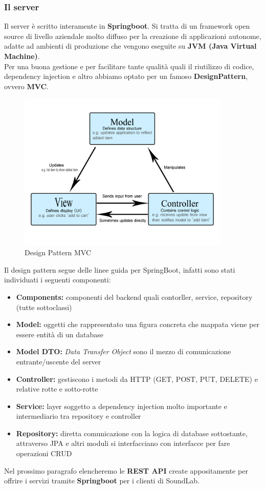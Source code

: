 \documentclass{article}
\begin{document}
		\subsubsection{Il server}
		Il server è scritto interamente in \textbf{Springboot}.
		Si tratta di un framework open source di livello aziendale molto diffuso per la creazione di applicazioni autonome, adatte ad ambienti di produzione che vengono eseguite su \textbf{JVM (Java Virtual Machine)}.\\
		Per una buona gestione e per facilitare tante qualità quali il riutilizzo di codice, dependency injection e altro abbiamo optato per un famoso \textbf{DesignPattern}, ovvero \textbf{MVC}.
		\begin{figure}[H]
			\centering
			\includegraphics[width=0.9\textwidth]{Immagini/mvc}
			\caption{Design Pattern MVC}
		\end{figure}
		Il design pattern segue delle linee guida per SpringBoot, infatti sono stati individuati i seguenti componenti:
		\begin{itemize}
			\item \textbf{Components:} componenti del backend quali contorller, service, repository (tutte sottoclassi)
			\item \textbf{Model:} oggetti che rappresentato una figura concreta che mappata viene per essere entità di un database
			\item \textbf{Model DTO:} \textit{Data Transfer Object} sono il mezzo di comunicazione entrante/uscente del server
			\item \textbf{Controller:} gestiscono i metodi da HTTP (GET, POST, PUT, DELETE) e relative rotte e sotto-rotte
			\item \textbf{Service:} layer soggetto a dependency injection molto importante e intermediario tra repository e controller
			\item \textbf{Repository:} diretta comunicazione con la logica di database sottostante, attraverso JPA e altri moduli si interfacciano con interfacce per fare
			operazioni CRUD
		\end{itemize}
	Nel prossimo paragrafo elencheremo le \textbf{REST API} create appositamente per offrire i servizi tramite \textbf{Springboot} per i clienti di SoundLab.
\end{document}
